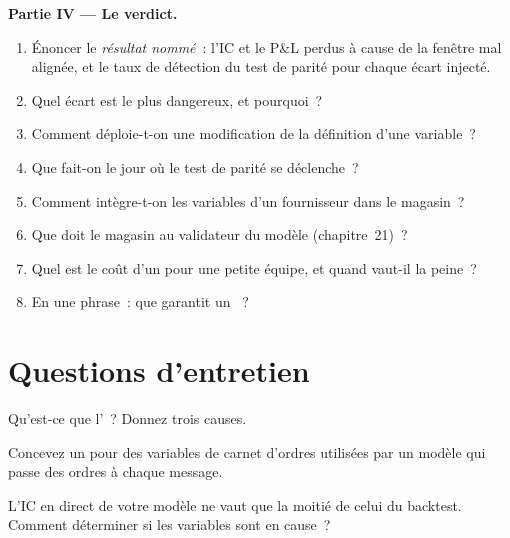 \begin{problem}
\medskip\noindent\textbf{Partie IV --- Le verdict.}
\begin{enumerate}[resume]
\item Énoncer le \emph{résultat nommé}~: l'IC et le P\&L perdus à cause de la fenêtre mal alignée, et le taux de détection du test de parité pour chaque
écart injecté.
\item Quel écart est le plus dangereux, et pourquoi~?
\item Comment déploie-t-on une modification de la définition d'une variable~?
\item Que fait-on le jour où le test de parité se déclenche~?
\item Comment intègre-t-on les variables d'un fournisseur dans le magasin~?
\item Que doit le magasin au validateur du modèle (chapitre~21)~?
\item Quel est le coût d'un  pour une petite équipe, et quand vaut-il la peine~?
\item En une phrase~: que garantit un ~?
\end{enumerate}
\end{problem}

\section{Questions d'entretien}

\begin{interviewq}\label{iq:ml:data-and-feature-stores:1}
Qu'est-ce que l'~? Donnez trois causes.
\end{interviewq}

\begin{interviewq}\label{iq:ml:data-and-feature-stores:2}
Concevez un  pour des variables de carnet d'ordres utilisées par un modèle qui passe des ordres à chaque message.
\end{interviewq}

\begin{interviewq}\label{iq:ml:data-and-feature-stores:3}
L'IC en direct de votre modèle ne vaut que la moitié de celui du backtest. Comment déterminer si les variables sont en cause~?
\end{interviewq}

